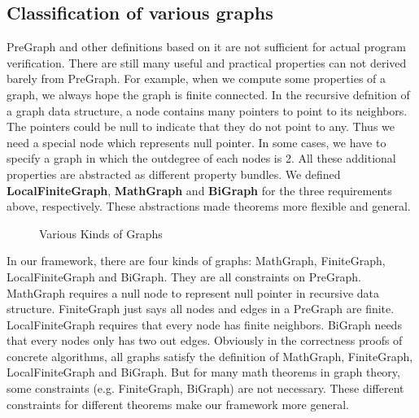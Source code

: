 \subsection{Classification of various graphs}

PreGraph and other definitions based on it are not sufficient for
actual program verification. There are still many useful and practical
properties can not derived barely from PreGraph. For example, when we
compute some properties of a graph, we always hope the graph is finite
connected. In the recursive defnition of a graph data structure, a
node contains many pointers to point to its neighbors. The pointers
could be null to indicate that they do not point to any. Thus we need
a special node which represents null pointer. In some cases, we have
to specify a graph in which the outdegree of each nodes is 2. All
these additional properties are abstracted as different property
bundles. We defined \textbf{LocalFiniteGraph}, \textbf{MathGraph}
and \textbf{BiGraph} for the three requirements above,
respectively. These abstractions made theorems more flexible and
general.

\begin{figure}[htbp]
\centering
{}
\caption{Various Kinds of Graphs}
\end{figure}

In our framework, there are four kinds of graphs: MathGraph,
FiniteGraph, LocalFiniteGraph and BiGraph. They are all constraints on
PreGraph. MathGraph requires a null node to represent null pointer in
recursive data structure. FiniteGraph just says all nodes and edges in
a PreGraph are finite. LocalFiniteGraph requires that every node has
finite neighbors. BiGraph needs that every nodes only has two out
edges. Obviously in the correctness proofs of concrete algorithms, all
graphs satisfy the definition of MathGraph, FiniteGraph,
LocalFiniteGraph and BiGraph. But for many math theorems in graph
theory, some constraints (e.g. FiniteGraph, BiGraph) are not
necessary. These different constraints for different theorems make our
framework more general.


